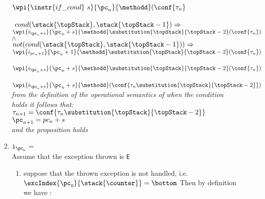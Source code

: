 \begin{enumerate}
\begin{enumerate}
		$\wpi{ \instr{if\_cond } \ s } {\pc_n  }{\methodd}  (\conf{\state{n}}$  \\
		 \\
	$  \ cond( \stack{\topStack}, \stack{\topStack - 1} ) \Rightarrow $  \\
\Myspace \Myspace $\wpi{ i_{\pc_n + s}}{\pc_n + s}{\methodd} \substitution{\topStack}{\topStack - 2} (\conf{\state{n}})$ \\ 
		$\wedge$\\
		$not(cond( \stack{\topStack}, \stack{\topStack - 1} )) \Rightarrow $ \\
\Myspace \Myspace $\wpi{i_{pc_{n} + 1} }{\pc_n + 1 }{\methodd} \substitution{\topStack}{\topStack - 2} (\conf{\state{n}} ) $\\
		\\
  		$ \wpi{ i_{\pc_n + s } }{\pc_n + s}{\methodd} \substitution{\topStack}{\topStack - 2}(\conf{\state{n}} )$ \\
  		\\
 		$ \wpi{ i_{\pc_n + s } }{\pc_n + s }{\methodd}(\conf{\state{n} \substitution{\topStack}{\topStack - 2} }  )$ \\
		 \textit{ from the definition of the operational semantics of } \textit{ when the condition holds it  follows that:} \\
		
$\state{n + 1} = \conf{\state{n} \substitution{\topStack }{\topStack - 2}}$ \\	
	$  	\pc_{n+1}= pc_n + s $ \\
	 \textit{and the proposition holds  }

	\item $\tt{i_{\pc_n}}$ =  \\
		Assume that the exception thrown is \texttt{E}
		\begin{enumerate}
			\item suppose that the thrown exception is not handled, i.e.  $\tt{ \excIndex{\pc_0 }{\stack{\counter}}}=\bottom$   
				Then by definition we have :\\
		            

\end{enumerate}
\end{enumerate}
\end{enumerate}
